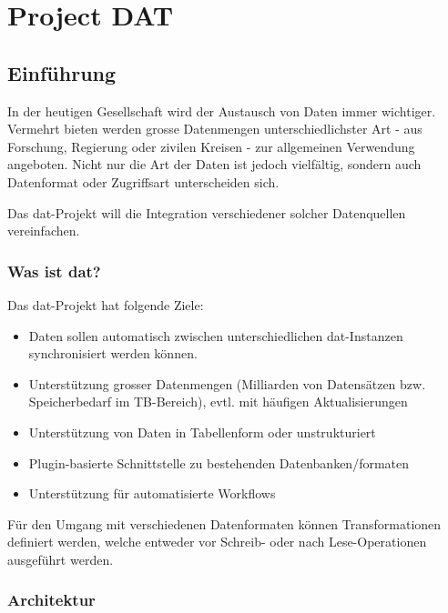 \part{Project DAT}

\chapter{Einführung}

In der heutigen Gesellschaft wird der Austausch von Daten immer wichtiger. Vermehrt bieten werden grosse Datenmengen unterschiedlichster Art - aus Forschung, Regierung oder zivilen Kreisen - zur allgemeinen Verwendung angeboten. Nicht nur die Art der Daten ist jedoch vielfältig, sondern auch Datenformat oder Zugriffsart unterscheiden sich.

Das \gls{dat}-Projekt will die Integration verschiedener solcher Datenquellen vereinfachen.

\section{Was ist dat?} %

Das dat-Projekt hat folgende Ziele: 

\begin{itemize}
\item Daten sollen automatisch zwischen unterschiedlichen dat-Instanzen synchronisiert werden können. 
\item Unterstützung grosser Datenmengen (Milliarden von Datensätzen bzw. Speicherbedarf im TB-Bereich), evtl. mit häufigen Aktualisierungen
\item Unterstützung von Daten in Tabellenform oder unstrukturiert
\item Plugin-basierte Schnittstelle zu bestehenden Datenbanken/formaten
\item Unterstützung für automatisierte Workflows
\end{itemize}

Für den Umgang mit verschiedenen Datenformaten können Transformationen definiert werden, welche entweder vor Schreib- oder nach Lese-Operationen ausgeführt werden.

\section{Architektur}

